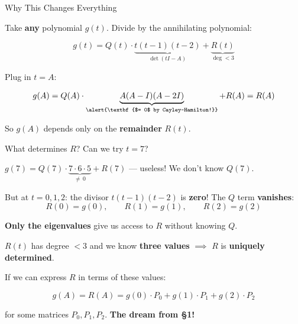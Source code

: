 \documentclass[10pt]{beamer}
\theoremstyle{definition}
\newcommand{\x}[1]{\alert{\textbf{#1}}}
\begin{document}
%
%
%
\begin{frame}[shrink=5]{Why This Changes Everything}

Take \x{any} polynomial $g(t)$. Divide by the annihilating polynomial:

$$g(t) = Q(t) \cdot \underbrace{t(t-1)(t-2)}_{\det(tI - A)} + \underbrace{R(t)}_{\deg < 3}$$

\vfill\pause

Plug in $t = A$:

$$g(A) = Q(A) \cdot \underbrace{A(A-I)(A-2I)}_{\x{$= 0$ by Cayley--Hamilton!}} + R(A) = R(A)$$

\vfill

So $g(A)$ depends only on the \x{remainder} $R(t)$.

\vfill\pause

What determines $R$? \; Can we try $t = 7$?

\medskip

$g(7) = Q(7) \cdot \underbrace{7 \cdot 6 \cdot 5}_{\neq\, 0} + R(7)$ \quad--- useless! We don't know $Q(7)$.

\vfill

But at $t = 0, 1, 2$: the divisor $t(t\!-\!1)(t\!-\!2)$ is \x{zero}! The $Q$ term \x{vanishes}:
$$R(0) = g(0), \qquad R(1) = g(1), \qquad R(2) = g(2)$$

\vfill

\x{Only the eigenvalues} give us access to $R$ without knowing $Q$.

\medskip

$R(t)$ has degree $< 3$ and we know \x{three values} $\implies$ $R$ is \x{uniquely determined}.

\vfill\pause

If we can express $R$ in terms of these values:

$$g(A) = R(A) = g(0) \cdot P_0 + g(1) \cdot P_1 + g(2) \cdot P_2$$

for some matrices $P_0, P_1, P_2$.  \; \x{The dream from \S 1!}

\end{frame}
\end{document}
